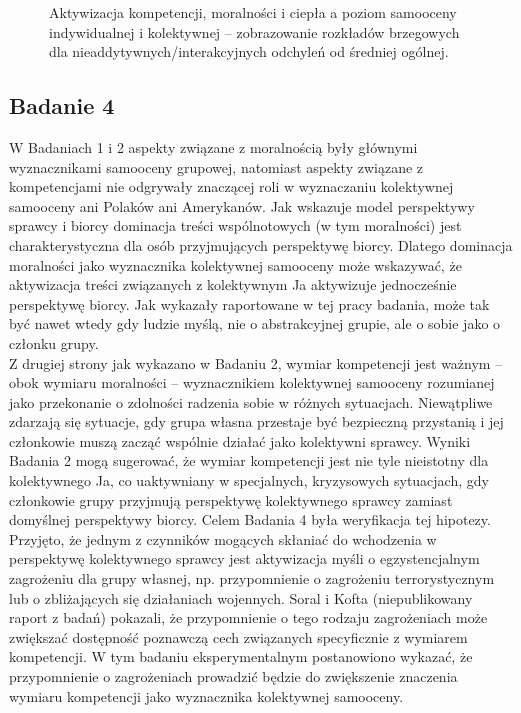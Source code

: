\documentclass[man]{apa6}
\begin{document}
\begin{figure*}[htbp]
   \centering
   \caption{Aktywizacja kompetencji, moralności i ciepła a poziom samooceny indywidualnej i kolektywnej -- zobrazowanie rozkładów brzegowych dla nieaddytywnych/interakcyjnych odchyleń od średniej ogólnej.}
   \label{fig:study3}
\end{figure*}



\newpage
\subsection{Badanie 4}

W Badaniach 1 i 2 aspekty związane z moralnością były głównymi wyznacznikami samooceny grupowej, natomiast aspekty związane z kompetencjami nie odgrywały znaczącej roli w wyznaczaniu kolektywnej samooceny ani Polaków ani Amerykanów. Jak wskazuje model perspektywy sprawcy i biorcy \parencite{wojciszke2011self} dominacja treści wspólnotowych (w tym moralności) jest charakterystyczna dla osób przyjmujących perspektywę biorcy. Dlatego dominacja moralności jako wyznacznika kolektywnej samooceny może wskazywać, że aktywizacja treści związanych z kolektywnym Ja aktywizuje jednocześnie perspektywę biorcy. Jak wykazały raportowane w tej pracy badania, może tak być nawet wtedy gdy ludzie myślą, nie o abstrakcyjnej grupie, ale o sobie jako o członku grupy. \\
Z drugiej strony jak wykazano w Badaniu 2, wymiar kompetencji jest ważnym -- obok wymiaru moralności -- wyznacznikiem kolektywnej samooceny rozumianej jako przekonanie o zdolności radzenia sobie w różnych sytuacjach. Niewątpliwe zdarzają się sytuacje, gdy grupa własna przestaje być bezpieczną przystanią i jej członkowie muszą zacząć wspólnie działać jako kolektywni sprawcy. Wyniki Badania 2 mogą sugerować, że wymiar kompetencji jest nie tyle nieistotny dla kolektywnego Ja, co uaktywniany w specjalnych, kryzysowych sytuacjach, gdy członkowie grupy przyjmują perspektywę kolektywnego sprawcy zamiast domyślnej perspektywy biorcy. Celem Badania 4 była weryfikacja tej hipotezy. \\
Przyjęto, że jednym z czynników mogących skłaniać do wchodzenia w perspektywę kolektywnego sprawcy jest aktywizacja myśli o egzystencjalnym zagrożeniu dla grupy własnej, np. przypomnienie o zagrożeniu terrorystycznym lub o zbliżających się działaniach wojennych. Soral i Kofta (niepublikowany raport z badań) pokazali, że przypomnienie o tego rodzaju zagrożeniach może zwiększać dostępność poznawczą cech związanych specyficznie z wymiarem kompetencji. W tym badaniu eksperymentalnym postanowiono wykazać, że przypomnienie o zagrożeniach prowadzić będzie do zwiększenie znaczenia wymiaru kompetencji jako wyznacznika kolektywnej samooceny.
\end{document}

